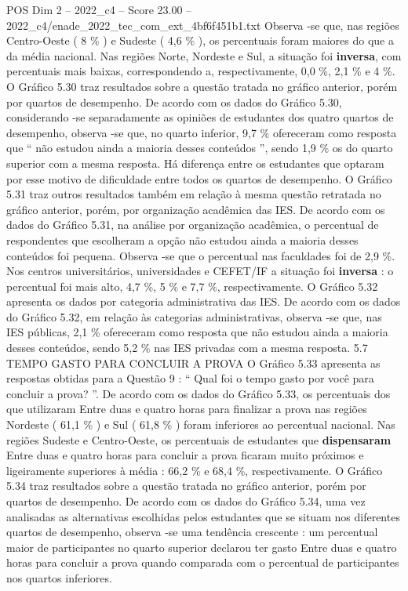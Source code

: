 \begin{textsample}{POS Dim 2 – 2022\_c4 – Score 23.00 – 2022\_c4/enade\_2022\_tec\_com\_ext\_4bf6f451b1.txt}
Observa -se que, nas regiões Centro-Oeste ( 8 \% ) e Sudeste ( 4,6 \% ), os percentuais foram maiores do que a da média nacional.
Nas regiões Norte, Nordeste e Sul, a situação foi \textbf{inversa}, com percentuais mais baixas, correspondendo a, respectivamente, 0,0 \%, 2,1 \% e 4 \%.
O Gráfico 5.30 traz resultados sobre a questão tratada no gráfico anterior, porém por quartos de desempenho.
De acordo com os dados do Gráfico 5.30, considerando -se separadamente as opiniões de estudantes dos quatro quartos de desempenho, observa -se que, no quarto inferior, 9,7 \% ofereceram como resposta que “ não estudou ainda a maioria desses conteúdos ”, sendo 1,9 \% os do quarto superior com a mesma resposta.
Há diferença entre os estudantes que optaram por esse motivo de dificuldade entre todos os quartos de desempenho.
O Gráfico 5.31 traz outros resultados também em relação à mesma questão retratada no gráfico anterior, porém, por organização acadêmica das IES.
De acordo com os dados do Gráfico 5.31, na análise por organização acadêmica, o percentual de respondentes que escolheram a opção não estudou ainda a maioria desses conteúdos foi pequena.
Observa -se que o percentual nas faculdades foi de 2,9 \%.
Nos centros universitários, universidades e CEFET/IF a situação foi \textbf{inversa} : o percentual foi mais alto, 4,7 \%, 5 \% e 7,7 \%, respectivamente.
O Gráfico 5.32 apresenta os dados por categoria administrativa das IES.
De acordo com os dados do Gráfico 5.32, em relação às categorias administrativas, observa -se que, nas IES públicas, 2,1 \% ofereceram como resposta que não estudou ainda a maioria desses conteúdos, sendo 5,2 \% nas IES privadas com a mesma resposta. 5.7 TEMPO GASTO PARA CONCLUIR A PROVA O Gráfico 5.33 apresenta as respostas obtidas para a Questão 9 : “ Qual foi o tempo gasto por você para concluir a prova? ”.
De acordo com os dados do Gráfico 5.33, os percentuais dos que utilizaram Entre duas e quatro horas para finalizar a prova nas regiões Nordeste ( 61,1 \% ) e Sul ( 61,8 \% ) foram inferiores ao percentual nacional.
Nas regiões Sudeste e Centro-Oeste, os percentuais de estudantes que \textbf{dispensaram} Entre duas e quatro horas para concluir a prova ficaram muito próximos e ligeiramente superiores à média : 66,2 \% e 68,4 \%, respectivamente.
O Gráfico 5.34 traz resultados sobre a questão tratada no gráfico anterior, porém por quartos de desempenho.
De acordo com os dados do Gráfico 5.34, uma vez analisadas as alternativas escolhidas pelos estudantes que se situam nos diferentes quartos de desempenho, observa -se uma tendência crescente : um percentual maior de participantes no quarto superior declarou ter gasto Entre duas e quatro horas para concluir a prova quando comparada com o percentual de participantes nos quartos inferiores.

\end{textsample}
